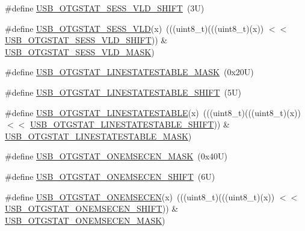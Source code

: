 \begin{DoxyCompactItemize}
\item 
\#define \mbox{\hyperlink{group___u_s_b___register___masks_ga69ae55ac7a03104ed013c34efa24ef43}{U\+S\+B\+\_\+\+O\+T\+G\+S\+T\+A\+T\+\_\+\+S\+E\+S\+S\+\_\+\+V\+L\+D\+\_\+\+S\+H\+I\+FT}}~(3\+U)
\item 
\#define \mbox{\hyperlink{group___u_s_b___register___masks_gac1508d9a4ed066ec8eee7c680ae72a8f}{U\+S\+B\+\_\+\+O\+T\+G\+S\+T\+A\+T\+\_\+\+S\+E\+S\+S\+\_\+\+V\+LD}}(x)~(((uint8\+\_\+t)(((uint8\+\_\+t)(x)) $<$$<$ \mbox{\hyperlink{group___u_s_b___register___masks_ga69ae55ac7a03104ed013c34efa24ef43}{U\+S\+B\+\_\+\+O\+T\+G\+S\+T\+A\+T\+\_\+\+S\+E\+S\+S\+\_\+\+V\+L\+D\+\_\+\+S\+H\+I\+FT}})) \& \mbox{\hyperlink{group___u_s_b___register___masks_ga9158e279053f0f684c33cba2ec1e68ee}{U\+S\+B\+\_\+\+O\+T\+G\+S\+T\+A\+T\+\_\+\+S\+E\+S\+S\+\_\+\+V\+L\+D\+\_\+\+M\+A\+SK}})
\item 
\#define \mbox{\hyperlink{group___u_s_b___register___masks_ga217f22f350652ae8ad2502c2baf8440b}{U\+S\+B\+\_\+\+O\+T\+G\+S\+T\+A\+T\+\_\+\+L\+I\+N\+E\+S\+T\+A\+T\+E\+S\+T\+A\+B\+L\+E\+\_\+\+M\+A\+SK}}~(0x20\+U)
\item 
\#define \mbox{\hyperlink{group___u_s_b___register___masks_ga34e5a04fe2a6546a9b22a40dc1f7c543}{U\+S\+B\+\_\+\+O\+T\+G\+S\+T\+A\+T\+\_\+\+L\+I\+N\+E\+S\+T\+A\+T\+E\+S\+T\+A\+B\+L\+E\+\_\+\+S\+H\+I\+FT}}~(5\+U)
\item 
\#define \mbox{\hyperlink{group___u_s_b___register___masks_ga3276c4f80d5d106f48ef29d41a6df5a9}{U\+S\+B\+\_\+\+O\+T\+G\+S\+T\+A\+T\+\_\+\+L\+I\+N\+E\+S\+T\+A\+T\+E\+S\+T\+A\+B\+LE}}(x)~(((uint8\+\_\+t)(((uint8\+\_\+t)(x)) $<$$<$ \mbox{\hyperlink{group___u_s_b___register___masks_ga34e5a04fe2a6546a9b22a40dc1f7c543}{U\+S\+B\+\_\+\+O\+T\+G\+S\+T\+A\+T\+\_\+\+L\+I\+N\+E\+S\+T\+A\+T\+E\+S\+T\+A\+B\+L\+E\+\_\+\+S\+H\+I\+FT}})) \& \mbox{\hyperlink{group___u_s_b___register___masks_ga217f22f350652ae8ad2502c2baf8440b}{U\+S\+B\+\_\+\+O\+T\+G\+S\+T\+A\+T\+\_\+\+L\+I\+N\+E\+S\+T\+A\+T\+E\+S\+T\+A\+B\+L\+E\+\_\+\+M\+A\+SK}})
\item 
\#define \mbox{\hyperlink{group___u_s_b___register___masks_gaf29778bce4dce2841774778e5c566bf5}{U\+S\+B\+\_\+\+O\+T\+G\+S\+T\+A\+T\+\_\+\+O\+N\+E\+M\+S\+E\+C\+E\+N\+\_\+\+M\+A\+SK}}~(0x40\+U)
\item 
\#define \mbox{\hyperlink{group___u_s_b___register___masks_gaac9cb5de36e29af8366533e2c05c31ac}{U\+S\+B\+\_\+\+O\+T\+G\+S\+T\+A\+T\+\_\+\+O\+N\+E\+M\+S\+E\+C\+E\+N\+\_\+\+S\+H\+I\+FT}}~(6\+U)
\item 
\#define \mbox{\hyperlink{group___u_s_b___register___masks_ga15a65fa9c8a41765e1091d1b90e5f8ff}{U\+S\+B\+\_\+\+O\+T\+G\+S\+T\+A\+T\+\_\+\+O\+N\+E\+M\+S\+E\+C\+EN}}(x)~(((uint8\+\_\+t)(((uint8\+\_\+t)(x)) $<$$<$ \mbox{\hyperlink{group___u_s_b___register___masks_gaac9cb5de36e29af8366533e2c05c31ac}{U\+S\+B\+\_\+\+O\+T\+G\+S\+T\+A\+T\+\_\+\+O\+N\+E\+M\+S\+E\+C\+E\+N\+\_\+\+S\+H\+I\+FT}})) \& \mbox{\hyperlink{group___u_s_b___register___masks_gaf29778bce4dce2841774778e5c566bf5}{U\+S\+B\+\_\+\+O\+T\+G\+S\+T\+A\+T\+\_\+\+O\+N\+E\+M\+S\+E\+C\+E\+N\+\_\+\+M\+A\+SK}})
$$
\end{DoxyCompactItemize}
